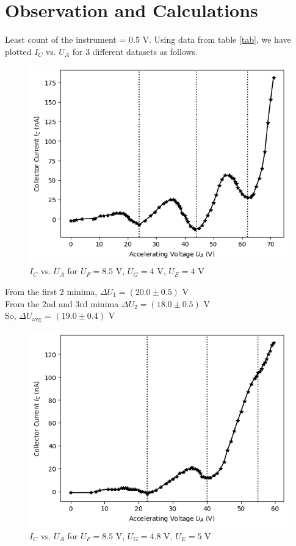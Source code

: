 \section{Observation and Calculations}
Least count of the instrument = 0.5 V.
Using data from table \ref{tab}, we have plotted $I_C$ vs. $U_A$ for 3 different datasets as follows.

\begin{figure}[H]
    \centering
    \includegraphics[width=1\columnwidth]{images/g1.png}
    \caption{$I_C$ vs. $U_A$ for $U_F = 8.5$ V, $U_{G} = 4$ V, $U_E=4$ V}
    \label{g1}
\end{figure}

\noindent From the first 2 minima, $\Delta U_1=(20.0 \pm 0.5)$  V\\
From the 2nd and 3rd minima $\Delta U_2=(18.0 \pm 0.5)$ V\\
So, $\Delta U_\text{avg}$ = $(19.0 \pm 0.4)$ V

\begin{figure}[H]
    \centering
    \includegraphics[width=1\columnwidth]{images/g3.png}
    \caption{$I_C$ vs. $U_A$ for $U_F = 8.5$ V, $U_{G} = 4.8$ V, $U_E=5$ V}
    \label{g3}
\end{figure}

